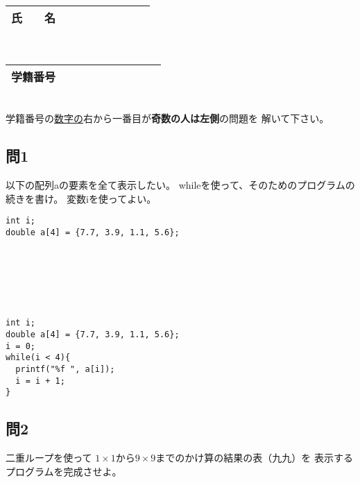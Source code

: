 \documentclass[a4j]{jarticle}
\def\ds{\displaystyle}
\begin{document}
\thispagestyle{empty}

\begin{multicols*}{2}%


\def\subst#1#2{$\ds #1$
 \ $\longrightarrow$\ 
 \underline{\hbox to 5cm{\ttfamily #2}}}



\noindent
\begin{tabular}[t]{|c|cccccccc|}\hline
氏　　名 & & & & & & & & \\ \hline
\end{tabular}\\
\begin{tabular}[t]{|c|c|c|c|c|c|c|c|c|c|}\hline
学籍番号 & & & & & & & & \\ \hline
\end{tabular}\\
学籍番号の\underline{数字の}右から一番目が{\bfseries 奇数の人は左側}の問題を
解いて下さい。
\vspace{-5ex}







\subsection*{問1}

以下の配列{\ttfamily a}の要素を全て表示したい。
{\ttfamily while}を使って、そのためのプログラムの続きを書け。
変数{\ttfamily i}を使ってよい。


\ifnum {}
\begin{verbatim}
int i;
double a[4] = {7.7, 3.9, 1.1, 5.6};







\end{verbatim}
\else
\begin{verbatim}
int i;
double a[4] = {7.7, 3.9, 1.1, 5.6};
i = 0;
while(i < 4){
  printf("%f ", a[i]);
  i = i + 1;
}
\end{verbatim}
\fi
\vspace{5cm}



\subsection*{問2}

二重ループを使って
$1\times1$から$9\times9$までのかけ算の結果の表（九九）を
表示するプログラムを完成させよ。



\end{multicols*}
\end{document}
